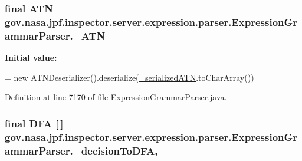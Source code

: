\subsubsection[{\texorpdfstring{\+\_\+\+A\+TN}{_ATN}}]{\setlength{\rightskip}{0pt plus 5cm}final A\+TN gov.\+nasa.\+jpf.\+inspector.\+server.\+expression.\+parser.\+Expression\+Grammar\+Parser.\+\_\+\+A\+TN\hspace{0.3cm}{\ttfamily [static]}}\hypertarget{classgov_1_1nasa_1_1jpf_1_1inspector_1_1server_1_1expression_1_1parser_1_1_expression_grammar_parser_acbfca7b6a47fa06a43ac7c24a3e25b6b}{}\label{classgov_1_1nasa_1_1jpf_1_1inspector_1_1server_1_1expression_1_1parser_1_1_expression_grammar_parser_acbfca7b6a47fa06a43ac7c24a3e25b6b}
{\bfseries Initial value\+:}
\begin{DoxyCode}
=
    \textcolor{keyword}{new} ATNDeserializer().deserialize(\hyperlink{classgov_1_1nasa_1_1jpf_1_1inspector_1_1server_1_1expression_1_1parser_1_1_expression_grammar_parser_aca4f67b078dbf8602bbf5361d56f3124}{\_serializedATN}.toCharArray())
\end{DoxyCode}


Definition at line 7170 of file Expression\+Grammar\+Parser.\+java.

\subsubsection[{\texorpdfstring{\+\_\+decision\+To\+D\+FA}{_decisionToDFA}}]{\setlength{\rightskip}{0pt plus 5cm}final D\+FA \mbox{[}$\,$\mbox{]} gov.\+nasa.\+jpf.\+inspector.\+server.\+expression.\+parser.\+Expression\+Grammar\+Parser.\+\_\+decision\+To\+D\+FA\hspace{0.3cm}{\ttfamily [static]}, {\ttfamily [protected]}}\hypertarget{classgov_1_1nasa_1_1jpf_1_1inspector_1_1server_1_1expression_1_1parser_1_1_expression_grammar_parser_affc2287bbadc1a8ed9ad3b8e5018a663}{}\label{classgov_1_1nasa_1_1jpf_1_1inspector_1_1server_1_1expression_1_1parser_1_1_expression_grammar_parser_affc2287bbadc1a8ed9ad3b8e5018a663}


